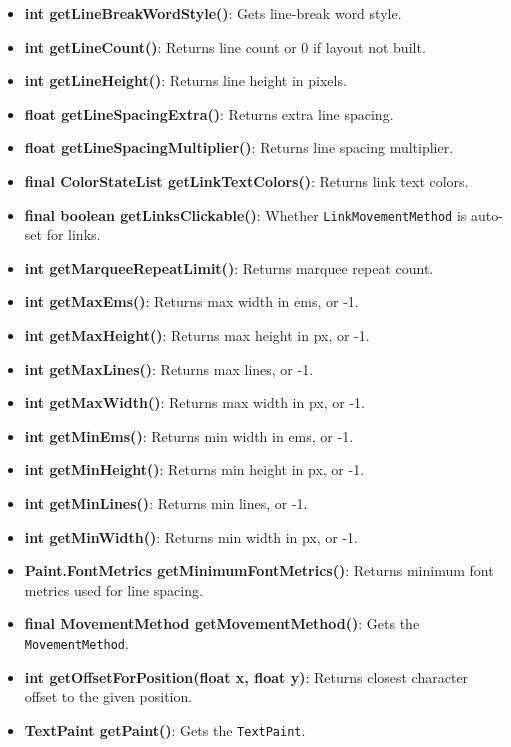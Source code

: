 \documentclass{report}
\begin{document}
\begin{itemize}
\begin{itemize}
                \item \textbf{int getLineBreakWordStyle()}: Gets line-break word style.
                \item \textbf{int getLineCount()}: Returns line count or 0 if layout not built.
                \item \textbf{int getLineHeight()}: Returns line height in pixels.
                \item \textbf{float getLineSpacingExtra()}: Returns extra line spacing.
                \item \textbf{float getLineSpacingMultiplier()}: Returns line spacing multiplier.
                \item \textbf{final ColorStateList getLinkTextColors()}: Returns link text colors.
                \item \textbf{final boolean getLinksClickable()}: Whether \texttt{LinkMovementMethod} is auto-set for links.
                \item \textbf{int getMarqueeRepeatLimit()}: Returns marquee repeat count.
                \item \textbf{int getMaxEms()}: Returns max width in ems, or -1.
                \item \textbf{int getMaxHeight()}: Returns max height in px, or -1.
                \item \textbf{int getMaxLines()}: Returns max lines, or -1.
                \item \textbf{int getMaxWidth()}: Returns max width in px, or -1.
                \item \textbf{int getMinEms()}: Returns min width in ems, or -1.
                \item \textbf{int getMinHeight()}: Returns min height in px, or -1.
                \item \textbf{int getMinLines()}: Returns min lines, or -1.
                \item \textbf{int getMinWidth()}: Returns min width in px, or -1.
                \item \textbf{Paint.FontMetrics getMinimumFontMetrics()}: Returns minimum font metrics used for line spacing.
                \item \textbf{final MovementMethod getMovementMethod()}: Gets the \texttt{MovementMethod}.
                \item \textbf{int getOffsetForPosition(float x, float y)}: Returns closest character offset to the given position.
                \item \textbf{TextPaint getPaint()}: Gets the \texttt{TextPaint}.

\end{itemize}
\end{itemize}
\end{document}
